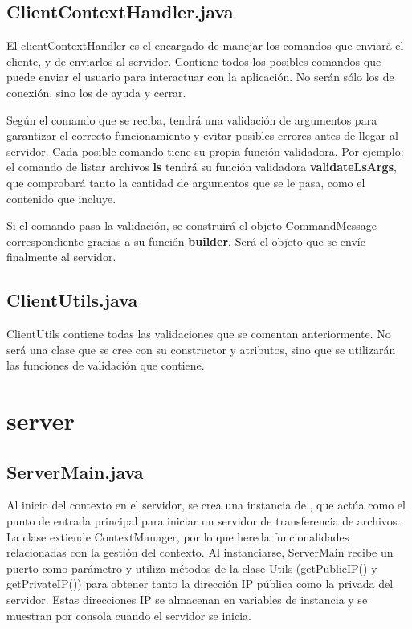 \documentclass[a4paper, 12pt]{report}
\begin{document}
\section{ClientContextHandler.java}

El clientContextHandler es el encargado de manejar los comandos que enviará el cliente, y de enviarlos al
servidor. Contiene todos los posibles comandos que puede enviar el usuario para interactuar con la aplicación.
No serán sólo los de conexión, sino los de ayuda y cerrar.

Según el comando que se reciba, tendrá una validación de argumentos para garantizar el correcto funcionamiento y
evitar posibles errores antes de llegar al servidor. Cada posible comando tiene su propia función validadora.
Por ejemplo: el comando de listar archivos \textbf{ls} tendrá su función validadora \textbf{validateLsArgs}, que
comprobará tanto la cantidad de argumentos que se le pasa, como el contenido que incluye.

Si el comando pasa la validación, se construirá el objeto CommandMessage correspondiente gracias a su función \textbf{builder}. Será el objeto que se envíe finalmente al servidor.

\section{ClientUtils.java}

ClientUtils contiene todas las validaciones que se comentan anteriormente. No será una clase que se cree con su
constructor y atributos, sino que se utilizarán las funciones de validación que contiene.


\chapter{server}

\section{ServerMain.java}

Al inicio del contexto en el servidor, se crea una instancia de , que actúa como el punto de
entrada principal para iniciar un servidor de transferencia de archivos. La clase extiende ContextManager,
por lo que hereda funcionalidades relacionadas con la gestión del contexto. Al instanciarse, ServerMain recibe
un puerto como parámetro y utiliza métodos de la clase Utils (getPublicIP() y getPrivateIP())
para obtener tanto la dirección IP pública como la privada del
servidor. Estas direcciones IP se almacenan en variables de instancia y se muestran por consola cuando el servidor se inicia.
\end{document}
